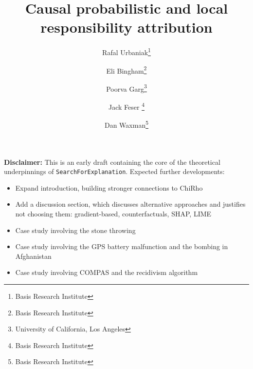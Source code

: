 \documentclass[twoside,11pt]{article}
\title{Causal probabilistic and local responsibility attribution}
\author{
  Rafal Urbaniak\thanks{Basis Research Institute} \and
  Eli Bingham\thanks{Basis Research Institute} \and
  Poorva Garg\thanks{University of California, Los Angeles} \and 
  Jack Feser \thanks{Basis Research Institute} \and
  Dan Waxman\thanks{Basis Research Institute}
}
\date{}
\newtheorem{definition}{Definition}
\renewcommand{\texttt}[1]{\lstinline[basicstyle=\fontsize{8pt}{8.25pt}\selectfont\ttfamily]{#1}}
\newcommand{\poorva}[1]{{\color{blue}[Poorva: #1]}}
\begin{document}
\maketitle

\vspace{-.5cm}


\noindent \textbf{Disclaimer:} This is an early draft containing the core of the theoretical underpinnings of \texttt{SearchForExplanation}. Expected further developments:

\vspace{-2mm}

\begin{itemize}[itemsep=0em]
  \item[$\square$] Expand introduction, building stronger connections to ChiRho
  \item[$\square$] Add a discussion section, which discusses alternative approaches and justifies not choosing them: gradient-based, counterfactuals, SHAP, LIME
    \item[$\square$] Case study involving the stone throwing
  \item[$\square$] Case study involving the GPS battery malfunction and the bombing in Afghanistan
  \item[$\square$] Case study involving COMPAS and the recidivism algorithm
\end{itemize}

\vspace{-5mm}


\tableofcontents





\end{document}
